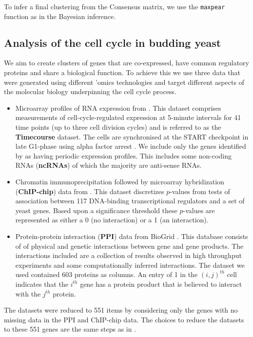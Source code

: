 \documentclass{bioinfo}
\begin{document}
To infer a final clustering from the Consensus matrix, we use the \texttt{maxpear} function as in the Bayesian inference. 

\subsection{Analysis of the cell cycle in budding yeast}
We aim to create clusters of genes that are co-expressed, have common regulatory proteins and share a biological function. To achieve this we use three data that were generated using different 'omics technologies and target different aspects of the molecular biology underpinning the cell cycle process.
\begin{itemize}
	\item Microarray profiles of RNA expression from \cite{granovskaia2010high}. This dataset comprises measurements of cell-cycle-regulated expression at 5-minute intervals for 41 time points (up to three cell division cycles) and is referred to as the \textbf{Timecourse} dataset. The cells are synchronised at the START checkpoint in late G1-phase using alpha factor arrest \citep{granovskaia2010high}. We include only the genes identified by \cite{granovskaia2010high} as having periodic expression profiles. This includes some non-coding RNAs (\textbf{ncRNAs}) of which the majority are anti-sense RNAs.
	\item Chromatin immunoprecipitation followed by microarray hybridization (\textbf{ChIP-chip}) data from \cite{harbison2004transcriptional}. This dataset discretizes $p$-values from tests of association between 117 DNA-binding transcriptional regulators and a set of yeast genes. Based upon a significance threshold these $p$-values are represented as either a 0 (no interaction) or a 1 (an interaction).
	\item Protein-protein interaction (\textbf{PPI}) data from BioGrid \citep{stark2006biogrid}. This database consists of of physical and genetic interactions between gene and gene products. The interactions included are a collection of results observed in high throughput experiments and some computationally inferred interactions. The dataset we used contained 603 proteins as columns. An entry of 1  in the $(i, j)^{th}$ cell indicates that the $i^{th}$ gene has a protein product that is believed to interact with the $j^{th}$ protein.
\end{itemize}
The datasets were reduced to 551 items by considering only the genes with no missing data in the PPI and ChIP-chip data. The choices to reduce the datasets to these 551 genes are the same steps as in \cite{kirk2012bayesian}. 
\end{document}
